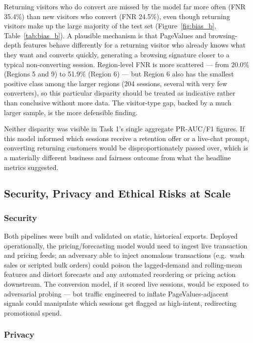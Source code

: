 Returning visitors who do convert are missed by the model far more often (FNR 35.4\%) than new
visitors who convert (FNR 24.5\%), even though returning visitors make up the large majority of
the test set (Figure~\ref{fig:bias_b}, Table~\ref{tab:bias_b}). A plausible mechanism is that
PageValues and browsing-depth features behave differently for a returning visitor who already
knows what they want and converts quickly, generating a browsing signature closer to a typical
non-converting session. Region-level FNR is more scattered --- from 20.0\% (Regions 5 and 9) to
51.9\% (Region 6) --- but Region 6 also has the smallest positive class among the larger regions
(204 sessions, several with very few converters), so this particular disparity should be treated
as indicative rather than conclusive without more data. The visitor-type gap, backed by a much
larger sample, is the more defensible finding.

Neither disparity was visible in Task 1's single aggregate PR-AUC/F1 figures. If this model
informed which sessions receive a retention offer or a live-chat prompt, converting returning
customers would be disproportionately passed over, which is a materially different business and
fairness outcome from what the headline metrics suggested.

\subsection{Security, Privacy and Ethical Risks at Scale}

\subsubsection*{Security}

Both pipelines were built and validated on static, historical exports. Deployed operationally, the
pricing/forecasting model would need to ingest live transaction and pricing feeds; an adversary
able to inject anomalous transactions (e.g.\ wash sales or scripted bulk orders) could poison the
lagged-demand and rolling-mean features and distort forecasts and any automated reordering or
pricing action downstream. The conversion model, if it scored live sessions, would be exposed to
adversarial probing --- bot traffic engineered to inflate PageValues-adjacent signals could
manipulate which sessions get flagged as high-intent, redirecting promotional spend.

\subsubsection*{Privacy}

